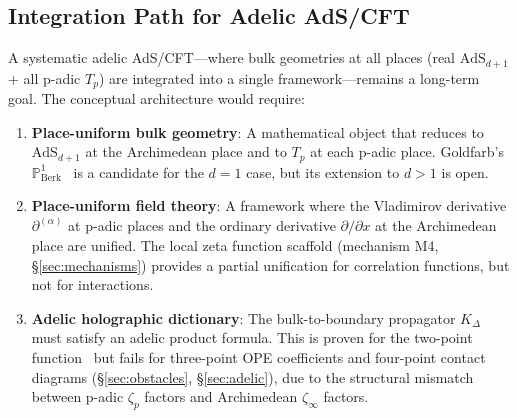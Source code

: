\documentclass[11pt,a4paper]{article}
\newcommand{\PoneBerk}{\mathbb{P}^1_{\mathrm{Berk}}}
\newcommand{\AdS}{\mathrm{AdS}}
\newcommand{\dpartial}{\partial^{(\alpha)}}
\newcommand{\KK}{K_\Delta}
\begin{document}
\begin{figure}[H]
\centering
{}
\end{figure}

\subsection{Integration Path for Adelic AdS/CFT}

A systematic adelic AdS/CFT---where bulk geometries at all places (real $\AdS_{d+1}$ + all p-adic $T_p$) are integrated into a single framework---remains a long-term goal. The conceptual architecture would require:

\begin{enumerate}[leftmargin=2em]
    \item \textbf{Place-uniform bulk geometry}: A mathematical object that reduces to $\AdS_{d+1}$ at the Archimedean place and to $T_p$ at each p-adic place. Goldfarb's $\PoneBerk$~\cite{G23} is a candidate for the $d=1$ case, but its extension to $d > 1$ is open.
    \item \textbf{Place-uniform field theory}: A framework where the Vladimirov derivative $\dpartial$ at p-adic places and the ordinary derivative $\partial/\partial x$ at the Archimedean place are unified. The local zeta function scaffold (mechanism M4, \S\ref{sec:mechanisms}) provides a partial unification for correlation functions, but not for interactions.
    \item \textbf{Adelic holographic dictionary}: The bulk-to-boundary propagator $\KK$ must satisfy an adelic product formula. This is proven for the two-point function~\cite{HSYZ20} but fails for three-point OPE coefficients and four-point contact diagrams (\S\ref{sec:obstacles}, \S\ref{sec:adelic}), due to the structural mismatch between p-adic $\zeta_p$ factors and Archimedean $\zeta_\infty$ factors.
\end{enumerate}
\end{document}
